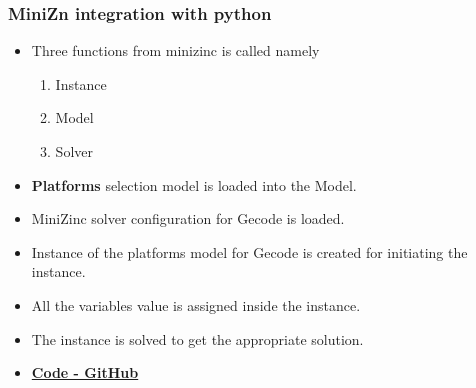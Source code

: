 \documentclass{beamer}
\begin{document}

\begin{frame}
        \frametitle{MiniZn integration with python}
            \begin{itemize}
                \item Three functions from minizinc is called namely
                \begin{enumerate}
                    \item Instance
                    \item Model
                    \item Solver
                \end{enumerate}
                \item \textbf{Platforms} selection model is loaded into the Model.
                \item MiniZinc solver configuration for Gecode is loaded.
                \item Instance of the platforms model for Gecode is created for initiating the instance.
                \item All the variables value is assigned inside the instance.
                \item The instance is solved to get the appropriate solution.
                \item \href{https://github.com/AshAswin/Adaptive-Deployment-of-Safety-Monitors-of-Autonomous-Systems/blob/Manojkl-miniZn-integration-with-python/MiniZn_integration_with_python.py}{\textbf{Code - GitHub}}
        
            \end{itemize}
    \end{frame}
\end{document}
